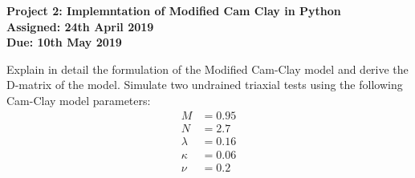 \documentclass[a4paper,12pt]{article}
\begin{document}
\begin{centering}
	\textbf{
		Project 2: Implemntation of Modified Cam Clay in Python\\
		Assigned: 24th April 2019\\
		Due: 10th May 2019\\
	}
\end{centering}

\vspace{1em}

Explain in detail the formulation of the Modified Cam-Clay model and derive the D-matrix
of the model. Simulate two undrained triaxial tests using the following Cam-Clay model
parameters:
\begin{align*}
M &= 0.95\\
N &= 2.7\\
\lambda &= 0.16\\
\kappa &= 0.06\\
\nu &= 0.2
\end{align*}
\end{document}
